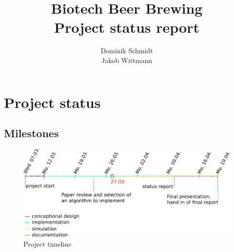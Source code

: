 \documentclass[a4paper,10pt]{article}
\title{Biotech Beer Brewing\\Project status report}
\author{Dominik Schmidt\\Jakob Wittmann}
\begin{document}
\maketitle


\section{Project status}
\subsection{Milestones}

\begin{figure}[h]
 \centering
 \includegraphics[width=\linewidth]{timeline.pdf}
 \caption{Project timeline}
 \label{fig:project_timeline}
\end{figure}
\end{document}
